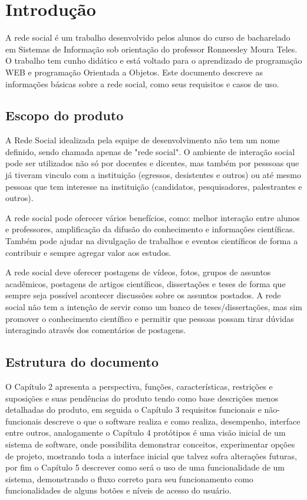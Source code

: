 \chapter{Introdução}

A rede social é um trabalho desenvolvido pelos alunos do curso de bacharelado em Sistemas de Informação sob orientação do professor Ronneesley Moura Teles.
O trabalho tem cunho didático e está voltado para o aprendizado de programação WEB e programação Orientada a Objetos.
Este documento descreve as informações básicas sobre a rede social, como seus requisitos e casos de uso.


\section{Escopo do produto}
A Rede Social idealizada pela equipe de desenvolvimento não tem um nome definido, sendo chamada apenas de "rede social".
O ambiente de interação social pode ser utilizados não só por docentes e dicentes, mas também por pesssoas que já tiveram vinculo com a instituição (egressos, desistentes e outros) ou até mesmo
pessoas que tem interesse na instituição (candidatos, pesquisadores, palestrantes e outros).

A rede social pode oferecer vários benefícios, como: melhor interação entre alunos e professores, amplificação da difusão do conhecimento e informações científicas.
Também pode ajudar na divulgação de trabalhos e eventos científicos de forma a contribuir e sempre agregar valor aos estudos.

A rede social deve oferecer postagens de vídeos, fotos, grupos de assuntos acadêmicos, postagens de artigos científicos, dissertações e teses de forma que sempre seja possível 
acontecer discussões sobre os assuntos postados. A rede social não tem a intenção de servir como um banco de teses/dissertações, mas sim promover o conhecimento científico e permitir
que pessoas possam tirar dúvidas interagindo através dos comentários de postagens. 
  

\section{Estrutura do documento}

O Capítulo 2 apresenta a perspectiva, funções, características, restrições e suposições e suas pendências do produto tendo como base descrições menos detalhadas do produto, em seguida o Capítulo 3 requisitos funcionais e não-funcionais descreve o que o software realiza e como realiza, desempenho, interface entre outros, analogamente o Capítulo 4 protótipos é uma visão inicial de um sistema de software, onde possibilita demonstrar conceitos, experimentar opções de projeto, mostrando toda a interface inicial que talvez sofra alterações futuras, por fim o Capítulo 5 descrever como será o uso de uma funcionalidade de um sistema, demonstrando o fluxo correto para seu funcionamento como funcionalidades de alguns botões e níveis de acesso do usuário.